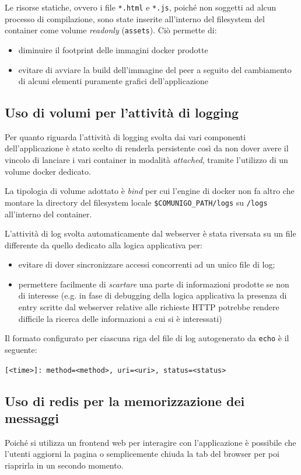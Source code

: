 \documentclass[conference]{IEEEtran}
\begin{document}
Le risorse statiche, ovvero i file \texttt{*.html} e \texttt{*.js}, poiché non soggetti ad alcun processo di compilazione, sono state inserite all'interno del filesystem del container come volume \textit{readonly} (\texttt{assets}). Ciò permette di:
\begin{itemize}
\item diminuire il footprint delle immagini docker prodotte
\item evitare di avviare la build dell'immagine del peer a seguito del cambiamento di alcuni elementi puramente grafici dell'applicazione
\end{itemize}

\subsection{Uso di volumi per l'attività di logging}
Per quanto riguarda l'attività di logging svolta dai vari componenti dell'applicazione è stato scelto di renderla persistente così da non dover avere il vincolo di lanciare i vari container in modalità \textit{attached}, tramite l'utilizzo di un volume docker dedicato.

La tipologia di volume adottato è \textit{bind} per cui l'engine di docker non fa altro che montare la directory del filesystem locale \texttt{\$COMUNIGO\_PATH/logs} su \texttt{/logs} all'interno del container.

L'attività di log svolta automaticamente dal webserver è stata riversata su un file differente da quello dedicato alla logica applicativa per:
\begin{itemize}
\item evitare di dover sincronizzare accessi concorrenti ad un unico file di log;
\item permettere facilmente di \textit{scartare} una parte di informazioni prodotte se non di interesse (e.g. in fase di debugging della logica applicativa la presenza di entry scritte dal webserver relative alle richieste HTTP potrebbe rendere difficile la ricerca delle informazioni a cui si è interessati)
\end{itemize}

Il formato configurato per ciascuna riga del file di log autogenerato da \texttt{echo} è il seguente:

\centerline{\scriptsize\texttt{[<time>]: method=<method>, uri=<uri>, status=<status>}}

\subsection{Uso di redis per la memorizzazione dei messaggi}
Poiché si utilizza un frontend web per interagire con l'applicazione è possibile che l'utenti aggiorni la pagina o semplicemente chiuda la tab del browser per poi riaprirla in un secondo momento.
\end{document}
